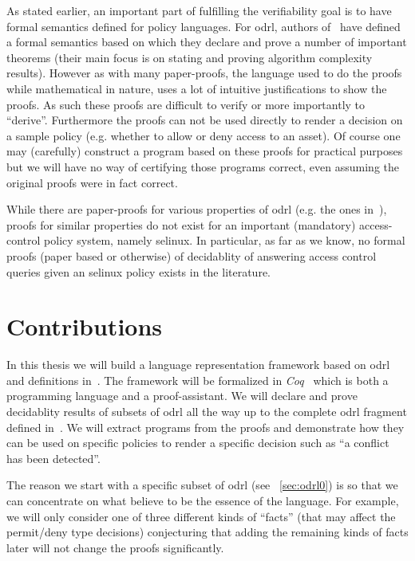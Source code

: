 As stated earlier, an important part of fulfilling the verifiability goal is to have formal semantics defined for policy languages. For \ac{odrl}, authors of~\cite{pucella2006} have defined a formal semantics based on which they declare and prove a number of important theorems (their main focus is on stating and proving algorithm complexity results). However as with many paper-proofs, the language used to do the proofs while mathematical in nature, uses a lot of intuitive justifications to show the proofs. As such these proofs are difficult to verify or more importantly to ``derive''. Furthermore the proofs can not be used directly to render a decision on a sample policy (e.g. whether to allow or deny access to an asset). Of course one may (carefully) construct a program based on these proofs for practical purposes but we will have no way of certifying those programs correct, even assuming the original proofs were in fact correct.

While there are paper-proofs for various properties of \ac{odrl} (e.g. the ones in~\cite{pucella2006}), proofs for similar properties do not exist for an important (mandatory) access-control policy system, namely \ac{selinux}. In particular, as far as we know, no formal proofs (paper based or otherwise) of decidablity of answering access control queries given an \ac{selinux} policy exists in the literature. 


\section{Contributions}

In this thesis we will build a language representation framework based on \ac{odrl} and definitions in~\cite{pucella2006}. The framework will be formalized in \emph{Coq}~\cite{coqref} which is both a programming language and a proof-assistant. We will declare and prove decidablity results of subsets of \ac{odrl} all the way up to the complete \ac{odrl} fragment defined in~\cite{pucella2006}. We will extract programs from the proofs and demonstrate how they can be used on specific policies to render a specific decision such as ``a conflict has been detected''. 

The reason we start with a specific subset of \ac{odrl} (see ~\ref{sec:odrl0}) is so that we can concentrate on what believe to be the essence of the language. For example, we will only consider one of three different kinds of ``facts'' (that may affect the permit/deny type decisions) conjecturing that adding the remaining kinds of facts later will not change the proofs significantly.

